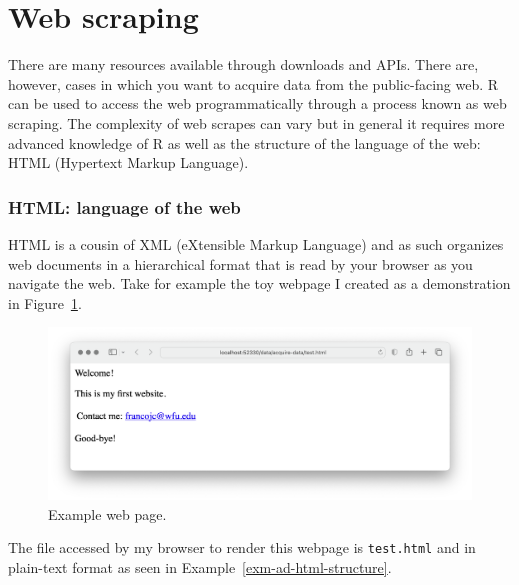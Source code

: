\documentclass[
  letterpaper,
  DIV=11,
  numbers=noendperiod]{scrreport}
\theoremstyle{definition}
\theoremstyle{remark}
\begin{document}
\hypertarget{sec-web-scraping}{%
\section{Web scraping}\label{sec-web-scraping}}

There are many resources available through downloads and APIs. There
are, however, cases in which you want to acquire data from the
public-facing web. R can be used to access the web programmatically
through a process known as web scraping. The complexity of web scrapes
can vary but in general it requires more advanced knowledge of R as well
as the structure of the language of the web: HTML (Hypertext Markup
Language).

\hypertarget{html-language-of-the-web}{%
\subsubsection{HTML: language of the
web}\label{html-language-of-the-web}}

HTML is a cousin of XML (eXtensible Markup Language) and as such
organizes web documents in a hierarchical format that is read by your
browser as you navigate the web. Take for example the toy webpage I
created as a demonstration in Figure~\ref{fig-ad-example-webpage}.

\begin{figure}[H]

{\centering \includegraphics[width=1\textwidth,height=\textheight]{figures/acquire-data/ad-test-html.png}

}

\caption{\label{fig-ad-example-webpage}Example web page.}

\end{figure}

The file accessed by my browser to render this webpage is
\texttt{test.html} and in plain-text format as seen in
Example~\ref{exm-ad-html-structure}.
\end{document}
